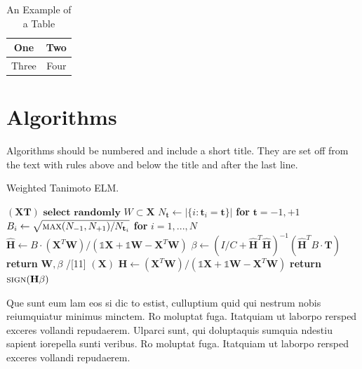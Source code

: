\documentclass[lettersize,journal]{IEEEtran}
\begin{document}
\begin{table}[!t]
  \caption{An Example of a Table\label{tab:table1}}
  \centering
  \begin{tabular}{|c||c|}
    \hline
    One   & Two  \\
    \hline
    Three & Four \\
    \hline
  \end{tabular}
\end{table}

\section{Algorithms}
Algorithms should be numbered and include a short title. They are set off from
the text with rules above and below the title and after the last line.

\begin{algorithm}[H]
  \caption{Weighted Tanimoto ELM.}\label{alg:alg1}
  \begin{algorithmic}
    \STATE
    $(\mathbf{X} \mathbf{T})$
    \STATE \hspace{0.5cm}$ \textbf{select randomly } W \subset \mathbf{X}  $
    \STATE \hspace{0.5cm}$ N_\mathbf{t} \gets | \{ i : \mathbf{t}_i = \mathbf{t} \} | $ \textbf{ for } $ \mathbf{t}= -1,+1 $
    \STATE \hspace{0.5cm}$ B_i \gets \sqrt{ \textsc{max}(N_{-1},N_{+1}) / N_{\mathbf{t}_i} } $ \textbf{ for } $ i = 1,...,N $
    \STATE \hspace{0.5cm}$ \hat{\mathbf{H}} \gets  B \cdot (\mathbf{X}^T\textbf{W})/( \mathbb{1}\mathbf{X} + \mathbb{1}\textbf{W} - \mathbf{X}^T\textbf{W} ) $
    \STATE \hspace{0.5cm}$ \beta \gets \left ( I/C + \hat{\mathbf{H}}^T\hat{\mathbf{H}} \right )^{-1}(\hat{\mathbf{H}}^T B\cdot \mathbf{T})  $
    \STATE \hspace{0.5cm}\textbf{return}  $\textbf{W},  \beta $
    \STATE /[11]
    $(\mathbf{X} )$
    \STATE \hspace{0.5cm}$ \mathbf{H} \gets  (\mathbf{X}^T\textbf{W} )/( \mathbb{1}\mathbf{X}  + \mathbb{1}\textbf{W}- \mathbf{X}^T\textbf{W}  ) $
    \STATE \hspace{0.5cm}\textbf{return}  $\textsc{sign}( \mathbf{H} \beta )$
  \end{algorithmic}
  \label{alg1}
\end{algorithm}

Que sunt eum lam eos si dic to estist, culluptium quid qui nestrum nobis
reiumquiatur minimus minctem. Ro moluptat fuga. Itatquiam ut laborpo rersped
exceres vollandi repudaerem. Ulparci sunt, qui doluptaquis sumquia ndestiu
sapient iorepella sunti veribus. Ro moluptat fuga. Itatquiam ut laborpo rersped
exceres vollandi repudaerem.
\end{document}
